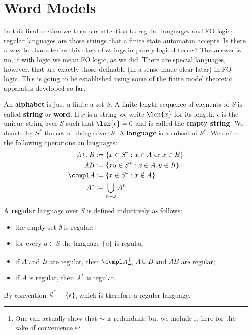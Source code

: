 \section{Word Models}
In this final section we turn our attention to regular languages and FO logic; regular languages are those strings that a finite state automaton accepts. 
Is there a way to characterize this class of strings in purely logical terms? 
The answer is no, if with logic we mean FO logic, as we did.  
There are special languages, however, that are exactly those definable (in a sense made clear later) in FO logic. 
This is going to be established using some of the finite model theoretic apparatus developed so far. 

An \textbf{alphabet} is just a finite a set $S$. 
A finite-length sequence of elements of $S$ is called \textbf{string} or \textbf{word}. 
If $x$ is a string we write $\len{x}$ for its length. 
$\epsilon$ is the unique string over $S$ such that $\len{\epsilon}=0$ and is called the \textbf{empty string}. 
We denote by $S^{\ast}$ the set of strings over $S$. 
A \textbf{language} is a subset of $S^{\ast}$. 
We define the following operations on languages: 
\begin{align*} 
A \cup B &:=\{x \in S^{\ast} : x \in A \text{ or } x \in B \} \\
AB &:=\{ xy \in S^{\ast} : x \in A, y \in B\} \\ 
\compl A&:=\{x \in S^{\ast} : x \notin A\} \\
A^{\ast} &:= \bigcup_{n \in \omega} A^n \text{.}
\end{align*}

\begin{defn} A \textbf{regular} language over $S$ is defined inductively as follows:
\begin{itemize}
\item the empty set $\emptyset$ is regular;
\item for every $a \in S$ the language $\{a\}$ is regular;
\item if $A$ and $B$ are regular, then $\compl A$\footnote{One can actually show that $\sim$ is redundant, but we include it here for the sake of convenience.}, $A \cup B$ and $AB$ are regular;
\item if $A$ is regular, then $A^{\ast}$ is regular.
\end{itemize} 
\end{defn}
By convention, $\emptyset^{\ast}=\{\epsilon\}$, which is therefore a regular language. 

